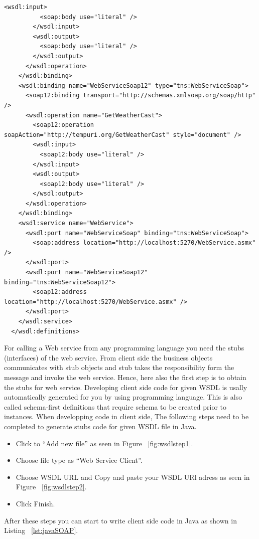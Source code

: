 \begin{lstlisting}[caption=WSDL Document for Weathercast Provider, label=lst:wsdldocument]
        <wsdl:input>
          <soap:body use="literal" />
        </wsdl:input>
        <wsdl:output>
          <soap:body use="literal" />
        </wsdl:output>
      </wsdl:operation>
    </wsdl:binding>
    <wsdl:binding name="WebServiceSoap12" type="tns:WebServiceSoap">
      <soap12:binding transport="http://schemas.xmlsoap.org/soap/http" />
      <wsdl:operation name="GetWeatherCast">
        <soap12:operation soapAction="http://tempuri.org/GetWeatherCast" style="document" />
        <wsdl:input>
          <soap12:body use="literal" />
        </wsdl:input>
        <wsdl:output>
          <soap12:body use="literal" />
        </wsdl:output>
      </wsdl:operation>
    </wsdl:binding>
    <wsdl:service name="WebService">
      <wsdl:port name="WebServiceSoap" binding="tns:WebServiceSoap">
        <soap:address location="http://localhost:5270/WebService.asmx" />
      </wsdl:port>
      <wsdl:port name="WebServiceSoap12" binding="tns:WebServiceSoap12">
        <soap12:address location="http://localhost:5270/WebService.asmx" />
      </wsdl:port>
    </wsdl:service>
  </wsdl:definitions>
\end{lstlisting}
For calling a Web service from any programming language you need the stubs (interfaces) of the web service. From client side the business objects communicates with stub objects and stub takes the responsibility form the message and invoke the web service. Hence, here also the first step is to obtain the stubs for  web service. Developing client side code for given WSDL is usally automatically generated for you by using programming language. This is also called  schema-first definitions that require schema to be created prior to instances. When developping code in client side, The following steps need to be completed to generate stubs code for given WSDL file in Java.
\begin{itemize}
  \item Click to “Add new file” as seen in Figure ~\ref{fig:wsdlstep1}.
  \item Choose file type as “Web Service Client”.
  \item Choose WSDL URL and Copy and paste your WSDL URl adress as seen in Figure ~\ref{fig:wsdlstep2}.
  \item Click Finish.
\end{itemize}

After these steps you can start to write client side code in Java as shown in Listing ~\ref{lst:javaSOAP}.


